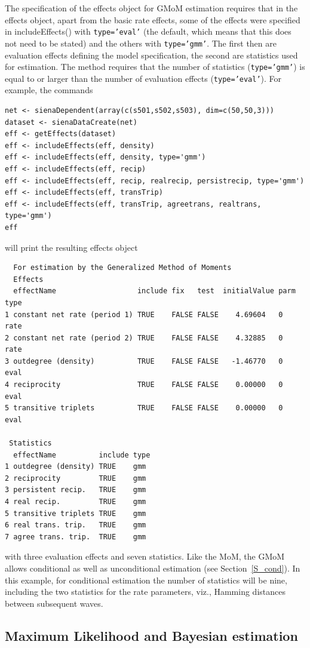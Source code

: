 \documentclass[a4paper,fleqn,11pt]{article}
\newcommand{\+}{\, + \,}
\newcommand{\sfn}[1]{\textsf{#1}}
\begin{document}
The specification of the effects object for GMoM estimation requires
that in the effects object, apart from the basic rate effects,
some of the effects were specified
in  \sfn{includeEffects()} with \texttt{type='eval'}
(the default, which means that this does not need to be stated)
and the others with \texttt{type='gmm'}.
The first then are evaluation effects defining the model specification,
the second are statistics used for estimation.
The method requires that the number of statistics (\texttt{type='gmm'})
is equal to or larger than the number of
evaluation effects (\texttt{type='eval'}).
For example, the commands

\begin{verbatim}
net <- sienaDependent(array(c(s501,s502,s503), dim=c(50,50,3)))
dataset <- sienaDataCreate(net)
eff <- getEffects(dataset)
eff <- includeEffects(eff, density)
eff <- includeEffects(eff, density, type='gmm')
eff <- includeEffects(eff, recip)
eff <- includeEffects(eff, recip, realrecip, persistrecip, type='gmm')
eff <- includeEffects(eff, transTrip)
eff <- includeEffects(eff, transTrip, agreetrans, realtrans, type='gmm')
eff
\end{verbatim}
will print the resulting effects object
\begin{verbatim}
  For estimation by the Generalized Method of Moments
  Effects
  effectName                   include fix   test  initialValue parm type
1 constant net rate (period 1) TRUE    FALSE FALSE    4.69604   0    rate
2 constant net rate (period 2) TRUE    FALSE FALSE    4.32885   0    rate
3 outdegree (density)          TRUE    FALSE FALSE   -1.46770   0    eval
4 reciprocity                  TRUE    FALSE FALSE    0.00000   0    eval
5 transitive triplets          TRUE    FALSE FALSE    0.00000   0    eval

 Statistics
  effectName          include type
1 outdegree (density) TRUE    gmm
2 reciprocity         TRUE    gmm
3 persistent recip.   TRUE    gmm
4 real recip.         TRUE    gmm
5 transitive triplets TRUE    gmm
6 real trans. trip.   TRUE    gmm
7 agree trans. trip.  TRUE    gmm
\end{verbatim}
with three evaluation effects and seven statistics.
Like the MoM, the GMoM allows conditional as well as unconditional
estimation (see Section~\ref{S_cond}).
In this example, for conditional estimation the number
of statistics will be nine, including the two statistics
for the rate parameters, viz., Hamming distances
between subsequent waves.

\subsection{Maximum Likelihood and Bayesian estimation}
\label{S_ML}
\label{S_Bayes}
\end{document}
